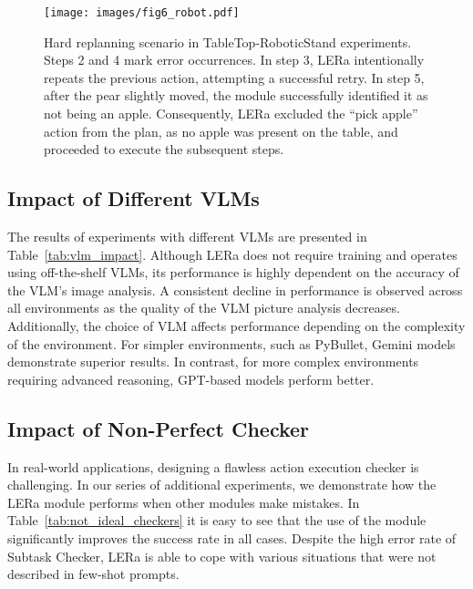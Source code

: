 \documentclass[letterpaper, 10 pt, conference]{ieeeconf}  %
\begin{document}
\begin{figure*}[ht!]
    \centering
    \texttt{[image: images/fig6\_robot.pdf]}
    \caption{
    Hard replanning scenario in TableTop-RoboticStand experiments. Steps 2 and 4 mark error occurrences. In step 3, LERa intentionally repeats the previous action, attempting a successful retry. In step 5, after the pear slightly moved, the module successfully identified it as not being an apple. Consequently, LERa excluded the ``pick apple'' action from the plan, as no apple was present on the table, and proceeded to execute the subsequent steps.
    }
    \label{fig:robot_run}
    \vspace{-10pt}
\end{figure*}

\subsection{Impact of Different VLMs}

The results of experiments with different VLMs are presented in Table~\ref{tab:vlm_impact}. 
Although LERa does not require training and operates using off-the-shelf VLMs, its performance is highly dependent on the accuracy of the VLM's image analysis. 
A consistent decline in performance is observed across all environments as the quality of the VLM picture analysis decreases.
Additionally, the choice of VLM affects performance depending on the complexity of the environment. For simpler environments, such as PyBullet, Gemini models demonstrate superior results. In contrast, for more complex environments requiring advanced reasoning, GPT-based models perform better.

\subsection{Impact of Non-Perfect Checker}
In real-world applications, designing a flawless action execution checker is challenging. In our series of additional experiments, we demonstrate how the LERa module performs when other modules make mistakes. In Table~\ref{tab:not_ideal_checkers} it is easy to see that the use of the module significantly improves the success rate in all cases. Despite the high error rate of Subtask Checker, LERa is able to cope with various situations that were not described in few-shot prompts.
\end{document}
